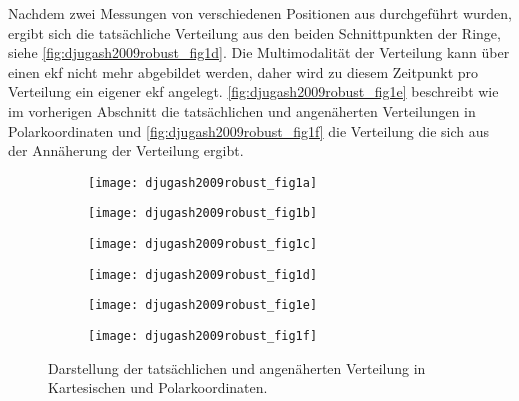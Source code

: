 Nachdem zwei Messungen von verschiedenen Positionen aus durchgeführt wurden, ergibt sich die tatsächliche Verteilung aus den beiden Schnittpunkten der Ringe, siehe \autoref{fig:djugash2009robust_fig1d}. Die Multimodalität der Verteilung kann über einen \Gls{ekf} nicht mehr abgebildet werden, daher wird zu diesem Zeitpunkt pro Verteilung ein eigener \Gls{ekf} angelegt. \autoref{fig:djugash2009robust_fig1e} beschreibt wie im vorherigen Abschnitt die tatsächlichen und angenäherten Verteilungen in Polarkoordinaten und \autoref{fig:djugash2009robust_fig1f} die Verteilung die sich aus der Annäherung der Verteilung ergibt.

\begin{figure}[h!]
	\centering
	\begin{subfigure}[b]{0.32\textwidth}
		\centering
		\texttt{[image: djugash2009robust\_fig1a]}
		\caption{}
		\label{fig:djugash2009robust_fig1a}
	\end{subfigure}
	\hfill
	\begin{subfigure}[b]{0.26\textwidth}
		\centering
		\texttt{[image: djugash2009robust\_fig1b]}
		\caption{}
		\label{fig:djugash2009robust_fig1b}
	\end{subfigure}
	\hfill
	\begin{subfigure}[b]{0.32\textwidth}
		\centering
		\texttt{[image: djugash2009robust\_fig1c]}
		\caption{}
		\label{fig:djugash2009robust_fig1c}
	\end{subfigure}
	\bigskip
		\begin{subfigure}[b]{0.32\textwidth}
		\centering
		\texttt{[image: djugash2009robust\_fig1d]}
		\caption{}
		\label{fig:djugash2009robust_fig1d}
	\end{subfigure}
	\hfill
	\begin{subfigure}[b]{0.26\textwidth}
		\centering
		\texttt{[image: djugash2009robust\_fig1e]}
		\caption{}
		\label{fig:djugash2009robust_fig1e}
	\end{subfigure}
	\hfill
	\begin{subfigure}[b]{0.32\textwidth}
		\centering
		\texttt{[image: djugash2009robust\_fig1f]}
		\caption{}
		\label{fig:djugash2009robust_fig1f}
	\end{subfigure}
	\caption{Darstellung der tatsächlichen und angenäherten Verteilung in Kartesischen und Polarkoordinaten.}
	\label{fig:djugash2009robust_fig1}
\end{figure}


